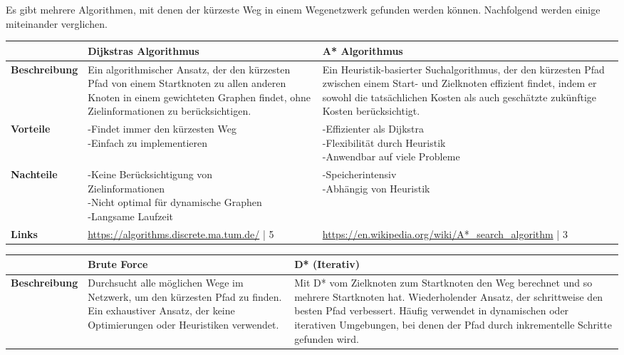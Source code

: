 Es gibt mehrere Algorithmen, mit denen der kürzeste Weg in einem Wegenetzwerk gefunden werden können. Nachfolgend werden einige miteinander verglichen. 


\begin{table}[H]
\centering
\small
\begin{tabularx}{\textwidth}{|l|X|X|}
\hline
\textbf{} & \textbf{Dijkstras Algorithmus} & \textbf{A* Algorithmus}\\
  \hline
  \textbf{Beschreibung} & Ein algorithmischer Ansatz, der den kürzesten Pfad von einem Startknoten zu allen anderen Knoten in einem gewichteten Graphen findet, ohne Zielinformationen zu berücksichtigen. & Ein Heuristik-basierter Suchalgorithmus, der den kürzesten Pfad zwischen einem Start- und Zielknoten effizient findet, indem er sowohl die tatsächlichen Kosten als auch geschätzte zukünftige Kosten berücksichtigt. \\
  \hline
  \textbf{Vorteile}  & \makecell{-Findet immer den kürzesten Weg \\ -Einfach zu implementieren} & \makecell{-Effizienter als Dijkstra \\ -Flexibilität durch Heuristik \\ -Anwendbar auf viele Probleme}\\
  \hline
  \textbf{Nachteile} & \makecell{-Keine Berücksichtigung von \\ Zielinformationen \\ -Nicht optimal für dynamische Graphen \\ -Langsame Laufzeit} & \makecell{-Speicherintensiv \\-Abhängig von Heuristik}\\
  \hline
  \textbf{Links} & \url{https://algorithms.discrete.ma.tum.de/} | 5  & \url{https://en.wikipedia.org/wiki/A*_search_algorithm} | 3 \\
  \hline
\end{tabularx}
\begin{tabularx}{\textwidth}{|l|X|X|}
\hline
\textbf{} & \textbf{Brute Force} & \textbf{D* (Iterativ)}\\
  \hline
  \textbf{Beschreibung} & Durchsucht alle möglichen Wege im Netzwerk, um den kürzesten Pfad zu finden. Ein exhaustiver Ansatz, der keine Optimierungen oder Heuristiken verwendet. & Mit D* vom Zielknoten zum Startknoten den Weg berechnet und so mehrere Startknoten hat. Wiederholender Ansatz, der schrittweise den besten Pfad verbessert. Häufig verwendet in dynamischen oder iterativen Umgebungen, bei denen der Pfad durch inkrementelle Schritte gefunden wird.\\

\end{tabularx}
\end{table}
